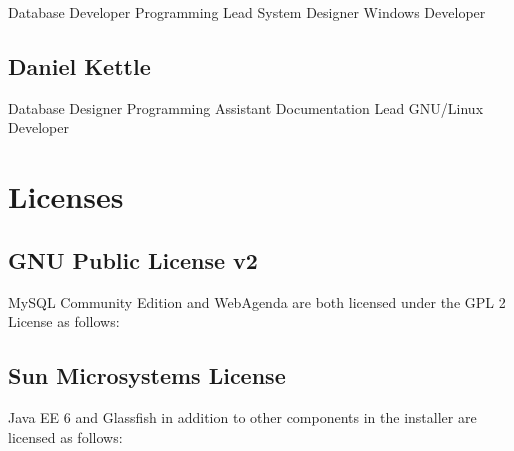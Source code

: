\documentclass[a4paper,10pt]{report}
\begin{document}
Database Developer \newline
Programming Lead \newline
System Designer \newline
Windows Developer

\section{Daniel Kettle}

Database Designer \newline
Programming Assistant \newline
Documentation Lead \newline
GNU/Linux Developer


\appendix

\chapter{Licenses}

\section{GNU Public License v2}

\par \noindent \hspace*{1cm} MySQL Community Edition and WebAgenda are both licensed under the GPL 2 License as follows:



\newpage

\section{Sun Microsystems License}

\par \noindent \hspace*{1cm} Java EE 6 and Glassfish in addition to other components in the installer are licensed as follows:


\end{document}
